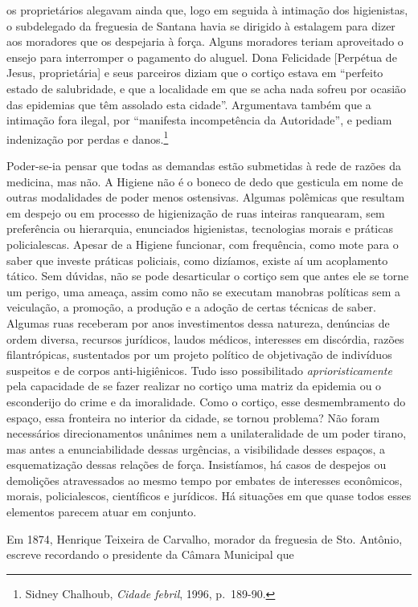 os proprietários alegavam ainda que, logo em seguida à intimação dos
higienistas, o subdelegado da freguesia de Santana havia se dirigido à
estalagem para dizer aos moradores que os despejaria à força. Alguns
moradores teriam aproveitado o ensejo para interromper o pagamento do
aluguel. Dona Felicidade {[}Perpétua de Jesus, proprietária{]} e seus
parceiros diziam que o cortiço estava em ``perfeito estado de
salubridade, e que a localidade em que se acha nada sofreu por ocasião
das epidemias que têm assolado esta cidade''. Argumentava também que a
intimação fora ilegal, por ``manifesta incompetência da Autoridade'', e
pediam indenização por perdas e danos.\footnote{Sidney Chalhoub,
  \emph{Cidade febril}, 1996, p.~189-90.}

Poder-se-ia pensar que todas as demandas estão submetidas à rede de
razões da medicina, mas não. A Higiene não é o boneco de dedo que
gesticula em nome de outras modalidades de poder menos ostensivas.
Algumas polêmicas que resultam em despejo ou em processo de higienização
de ruas inteiras ranquearam, sem preferência ou hierarquia, enunciados
higienistas, tecnologias morais e práticas policialescas. Apesar de a
Higiene funcionar, com frequência, como mote para o saber que investe
práticas policiais, como dizíamos, existe aí um acoplamento tático. Sem
dúvidas, não se pode desarticular o cortiço sem que antes ele se torne
um perigo, uma ameaça, assim como não se executam manobras políticas sem
a veiculação, a promoção, a produção e a adoção de certas técnicas de
saber. Algumas ruas receberam por anos investimentos dessa natureza,
denúncias de ordem diversa, recursos jurídicos, laudos médicos,
interesses em discórdia, razões filantrópicas, sustentados por um
projeto político de objetivação de indivíduos suspeitos e de corpos
anti-higiênicos. Tudo isso possibilitado \emph{aprioristicamente} pela
capacidade de se fazer realizar no cortiço uma matriz da epidemia ou o
esconderijo do crime e da imoralidade. Como o cortiço, esse
desmembramento do espaço, essa fronteira no interior da cidade, se
tornou problema? Não foram necessários direcionamentos unânimes nem a
unilateralidade de um poder tirano, mas antes a enunciabilidade dessas
urgências, a visibilidade desses espaços, a esquematização dessas
relações de força. Insistíamos, há casos de despejos ou demolições
atravessados ao mesmo tempo por embates de interesses econômicos,
morais, policialescos, científicos e jurídicos. Há situações em que
quase todos esses elementos parecem atuar em conjunto.

Em 1874, Henrique Teixeira de Carvalho, morador da freguesia de Sto.
Antônio, escreve recordando o presidente da Câmara Municipal que


